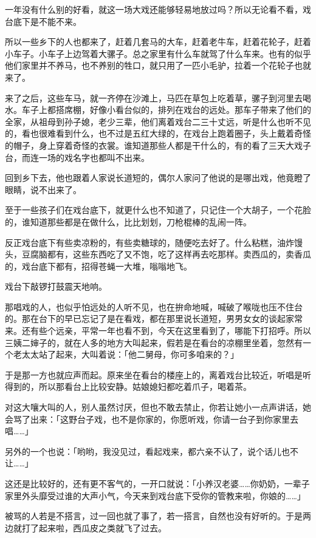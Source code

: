 \documentclass[UTF8]{ctexart}
\begin{document}
一年没有什么别的好看，就这一场大戏还能够轻易地放过吗？所以无论看不看，戏台底下是不能不来。

所以一些乡下的人也都来了，赶着几套马的大车，赶着老牛车，赶着花轮子，赶着小车子。小车子上边驾着大骡子。总之家里有什么车就驾了什么车来。也有的似乎他们家里并不养马，也不养别的牲口，就只用了一匹小毛驴，拉着一个花轮子也就来了。

来了之后，这些车马，就一齐停在沙滩上，马匹在草包上吃着草，骡子到河里去喝水。车子上都搭席棚，好像小看台似的，排列在戏台的远处。那车子带来了他们的全家，从祖母到孙子媳，老少三辈，他们离着戏台二三十丈远，听是什么也听不见的，看也很难看到什么，也不过是五红大绿的，在戏台上跑着圈子，头上戴着奇怪的帽子，身上穿着奇怪的衣裳。谁知道那些人都是干什么的，有的看了三天大戏子台，而连一场的戏名字也都叫不出来。

回到乡下去，他也跟着人家说长道短的，偶尔人家问了他说的是哪出戏，他竟瞪了眼睛，说不出来了。

至于一些孩子们在戏台底下，就更什么也不知道了，只记住一个大胡子，一个花脸的，谁知道那些都是在做什么，比比划划，刀枪棍棒的乱闹一阵。

反正戏台底下有些卖凉粉的，有些卖糖球的，随便吃去好了。什么粘糕，油炸馒头，豆腐脑都有，这些东西吃了又不饱，吃了这样再去吃那样。卖西瓜的，卖香瓜的，戏台底下都有，招得苍蝇一大堆，嗡嗡地飞。

戏台下敲锣打鼓震天地响。

那唱戏的人，也似乎怕远处的人听不见，也在拚命地喊，喊破了喉咙也压不住台的。那在台下的早已忘记了是在看戏，都在那里说长道短，男男女女的谈起家常来。还有些个远亲，平常一年也看不到，今天在这里看到了，哪能下打招呼。所以三姨二婶子的，就在人多的地方大叫起来，假若是在看台的凉棚里坐着，忽然有一个老太太站了起来，大叫着说：「他二舅母，你可多咱来的？」

于是那一方也就应声而起。原来坐在看台的楼座上的，离着戏台比较近，听唱是听得到的，所以那看台上比较安静。姑娘媳妇都吃着爪子，喝着茶。

对这大嚷大叫的人，别人虽然讨厌，但也不敢去禁止，你若让她小一点声讲话，她会骂了出来：「这野台子戏，也不是你家的，你愿听戏，你请一台子到你家里去唱……」

另外的一个也说：「哟哟，我没见过，看起戏来，都六亲不认了，说个话儿也不让……」

这还是比较好的，还有更不客气的，一开口就说：「小养汉老婆……你奶奶，一辈子家里外头靡受过谁的大声小气，今天来到戏台底下受你的管教来啦，你娘的……」

被骂的人若是不搭言，过一回也就了事了，若一搭言，自然也没有好听的。于是两边就打了起来啦，西瓜皮之类就飞了过去。
\end{document}
